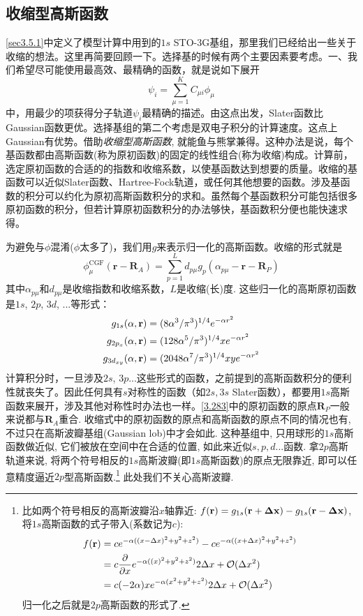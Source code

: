 \subsection{收缩型高斯函数}
\ref{sec3.5.1}中定义了模型计算中用到的$1s$ STO-3G基组，那里我们已经给出一些关于收缩的想法。这里再简要回顾一下。选择基的时候有两个主要因素要考虑。一、我们希望尽可能使用最高效、最精确的函数，就是说如下展开
\begin{equation}
\psi_i=\sum_{\mu=1}^{K}C_{\mu i}\phi_\mu
\end{equation}
中，用最少的项获得分子轨道$\psi_i$最精确的描述。由这点出发，Slater函数比Gaussian函数更优。选择基组的第二个考虑是双电子积分的计算速度。这点上Gaussian有优势。借助\emph{收缩型高斯函数}, 就能鱼与熊掌兼得。这种办法是说，每个基函数都由高斯函数(称为原初函数)的固定的线性组合(称为收缩)构成。计算前，选定原初函数的合适的的指数和收缩系数，以使基函数达到想要的质量。收缩的基函数可以近似Slater函数、Hartree-Fock轨道，或任何其他想要的函数。涉及基函数的积分可以约化为原初高斯函数积分的求和。虽然每个基函数积分可能包括很多原初函数的积分，但若计算原初函数积分的办法够快，基函数积分便也能快速求得。

为避免与$\phi$混淆($\phi$太多了)，我们用$g$来表示归一化的高斯函数。收缩的形式就是
\begin{equation}
\phi^\mathrm{CGF}_\mu(\mathbf{r-R}_A)=\sum_{p=1}^{L}d_{p\mu}g_p(\alpha_{p\mu}-\mathbf{r-R}_P)
\end{equation}
其中$\alpha_{p\mu}$和$d_{p\mu}$是收缩指数和收缩系数，$L$是收缩(长)度. 这些归一化的高斯原初函数是$1s$, $2p$, $3d$, ...等形式：
\begin{align}
g_{1s}(\alpha,\mathbf{r})      & = (8\alpha^3/\pi^3)^{1/4}       e^{-\alpha r^2}\\
g_{2p_x}(\alpha,\mathbf{r})    & = (128\alpha^5/\pi^3)^{1/4}  x  e^{-\alpha r^2}\\
g_{3d_{xy}}(\alpha,\mathbf{r}) & = (2048\alpha^7/\pi^3)^{1/4} xy e^{-\alpha r^2}
\end{align}
计算积分时，一旦涉及$2s$, $3p$...这些形式的函数，之前提到的高斯函数积分的便利性就丧失了。因此任何具有$s$对称性的函数（如$2s,3s$ Slater函数），都要用$1s$高斯函数来展开，涉及其他对称性时办法也一样。\eqref{3.283}中的原初函数的原点$\mathbf{R}_P$一般来说都与$\mathbf{R}_A$重合. 收缩式中的原初函数的原点和高斯函数的原点不同的情况也有, 不过只在高斯波瓣基组(Gaussian lob)中才会如此. 这种基组中, 只用球形的$1s$高斯函数做近似, 它们被放在空间中在合适的位置, 如此来近似$s,p,d$...函数. 拿$2p$高斯轨道来说, 将两个符号相反的$1s$高斯波瓣(即$1s$高斯函数)的原点无限靠近, 即可以任意精度逼近$2p$型高斯函数.\footnote{
比如两个符号相反的高斯波瓣沿$x$轴靠近: $f(\mathbf{r})=g_{1s}(\mathbf{r}+\mathbf{\Delta x})-g_{1s}(\mathbf{r}-\mathbf{\Delta x})$, 将$1s$高斯函数的式子带入(系数记为$c$):
\begin{align*}
f(\mathbf{r}) & = ce^{-\alpha((x-\Delta x)^2+y^2+z^2)}-
ce^{-\alpha((x+\Delta x)^2+y^2+z^2)}\\
        & = c\frac{\partial}{\partial x}e^{-\alpha((x)^2+y^2+z^2)}2\Delta x +\mathcal{O}(\Delta x^2)\\
        & = c(-2\alpha) xe^{-\alpha(x^2+y^2+z^2)}2\Delta x +\mathcal{O}(\Delta x^2)
\end{align*}
归一化之后就是$2p$高斯函数的形式了.
}
此处我们不关心高斯波瓣.

